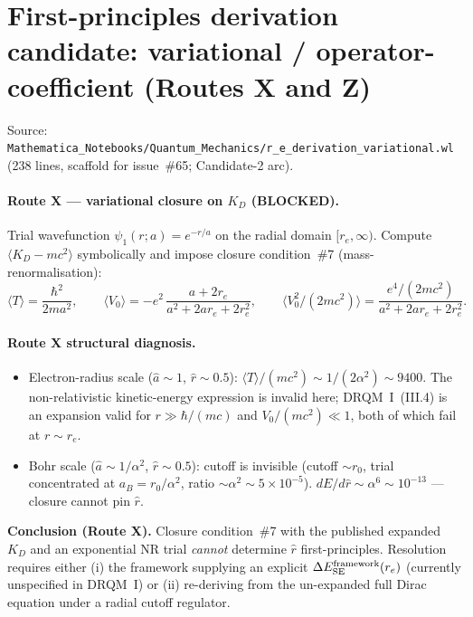 \section{First-principles derivation candidate: variational / operator-coefficient (Routes X and Z)}
\label{sec:eq-variational}

Source:
\texttt{Mathematica\_Notebooks/Quantum\_Mechanics/r\_e\_derivation\_variational.wl}
(238 lines, scaffold for issue~\#65; Candidate-2 arc).

\paragraph{Route X --- variational closure on $K_D$ (BLOCKED).}
Trial wavefunction $\psi_1(r;a) = e^{-r/a}$ on the radial domain $[r_e,\infty)$.
Compute $\langle K_D - mc^2 \rangle$ symbolically and impose closure
condition~\#7 (mass-renormalisation):
\[
\langle T\rangle = \frac{\hbar^2}{2 m a^2},\qquad
\langle V_0\rangle = -e^2\,\frac{a + 2 r_e}{a^2 + 2 a r_e + 2 r_e^2},\qquad
\langle V_0^2/(2mc^2)\rangle = \frac{e^4/(2 m c^2)}{a^2 + 2 a r_e + 2 r_e^2}.
\]

\paragraph{Route X structural diagnosis.}
\begin{itemize}[topsep=2pt,itemsep=0pt]
  \item Electron-radius scale ($\hat a \sim 1$, $\hat r \sim 0.5$):
        $\langle T\rangle/(mc^2) \sim 1/(2\alpha^2) \sim 9400$. The
        non-relativistic kinetic-energy expression is invalid here;
        DRQM~I~(III.4) is an expansion valid for $r \gg \hbar/(mc)$ and
        $V_0/(mc^2) \ll 1$, both of which fail at $r \sim r_e$.
  \item Bohr scale ($\hat a \sim 1/\alpha^2$, $\hat r \sim 0.5$): cutoff is
        invisible (cutoff $\sim r_0$, trial concentrated at
        $a_B = r_0/\alpha^2$, ratio $\sim \alpha^2 \sim 5\times 10^{-5}$).
        $dE/d\hat r \sim \alpha^6 \sim 10^{-13}$ --- closure cannot pin
        $\hat r$.
\end{itemize}
\textbf{Conclusion (Route X).} Closure condition~\#7 with the published
expanded $K_D$ and an exponential NR trial \emph{cannot} determine $\hat r$
first-principles. Resolution requires either (i) the framework supplying an
explicit $\Delta E_{\rm SE}^{\rm framework}(r_e)$ (currently unspecified in
DRQM~I) or (ii) re-deriving from the un-expanded full Dirac equation under a
radial cutoff regulator.

